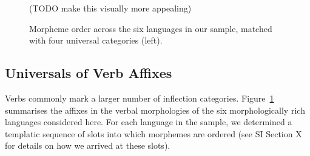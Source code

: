 \documentclass[11pt,letterpaper]{article}
\newcommand\mhahn[1]{{\color{red}(#1)}}
\begin{document}
\begin{figure}

\mhahn{TODO make this visually more appealing}

    \caption{Morpheme order across the six languages in our sample, matched with four universal categories (left).}
    \label{tab:table-orders}
\end{figure}

\subsection{Universals of Verb Affixes}\label{sec:univ-verbs}
Verbs commonly mark a larger number of inflection categories.
Figure~\ref{tab:table-orders} summarises the affixes in the verbal morphologies of the six morphologically rich languages considered here.
For each language in the sample, we determined a templatic sequence of slots into which morphemes are ordered (see SI Section X for details on how we arrived at these slots).
\end{document}
